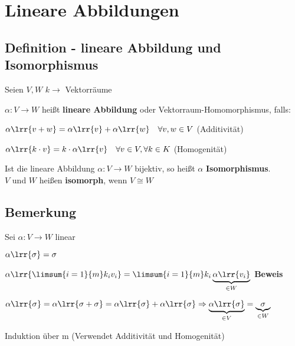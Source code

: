 \newpage
\section{Lineare Abbildungen}
	
\subsection{Definition - lineare Abbildung und Isomorphismus}
	Seien $V,W$ $k\rightarrow$ Vektorräume
		\item $\alpha:V\rightarrow W$ heißt \textbf{lineare Abbildung} oder Vektorraum-Homomorphismus, falls:
				\item $\alpha\lrr{v+w}=\alpha\lrr{v}+\alpha\lrr{w}\quad\forall v,w\in V$ (Additivität)
				\item $\alpha\lrr{k\cdot v}=k\cdot\alpha\lrr{v}\quad\forall v\in V,\forall k\in K$ (Homogenität)
			\subExEnd
		\item Ist die lineare Abbildung $\alpha: V\rightarrow W$ bijektiv, so heißt $\alpha$ \textbf{Isomorphismus}.\\
			$V$ und $W$ heißen \textbf{isomorph}, wenn $V\cong W$
	\subExEnd
	
\subsection{Bemerkung}
	Sei $\alpha:V\rightarrow W$ linear
		\item $\alpha\lrr{\sigma}=\sigma$
		\item $\alpha\lrr{\limsum{i=1}{m}k_iv_i}=\limsum{i=1}{m}k_i\underbrace{\alpha\lrr{v_i}}_{\scriptstyle \in W}$
	\subExEnd
	\textbf{Beweis}
		\item $\alpha\lrr{\sigma}=\alpha\lrr{\sigma+\sigma}=\alpha\lrr{\sigma}+\alpha\lrr{\sigma}\Rightarrow\underbrace{\alpha\lrr{\sigma}}_{\scriptstyle \in V}=\underbrace{\sigma}_{\scriptstyle \in W}$
		\item Induktion über m (Verwendet Additivität und Homogenität)
	\subExEnd
	

